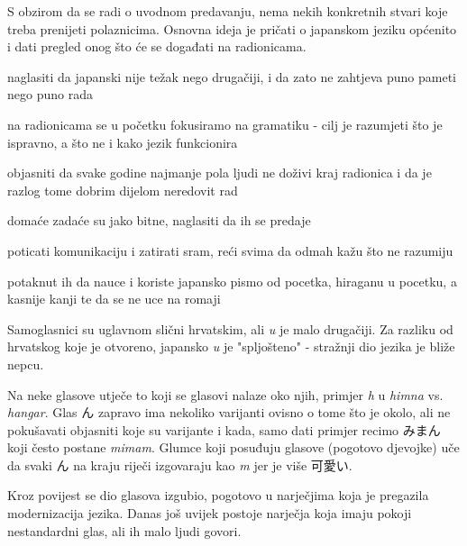 
\author{autor}

	
	S obzirom da se radi o uvodnom predavanju, nema nekih konkretnih stvari koje treba prenijeti polaznicima. Osnovna ideja je pričati o japanskom jeziku općenito i dati pregled onog što će se događati na radionicama.
	
	\begin{hyou}
		\item naglasiti da japanski nije težak nego drugačiji, i da zato ne zahtjeva puno pameti nego puno rada
		\item na radionicama se u početku fokusiramo na gramatiku - cilj je razumjeti što je ispravno, a što ne i kako jezik funkcionira
		\item objasniti da svake godine najmanje pola ljudi ne doživi kraj radionica i da je razlog tome dobrim dijelom neredovit rad
		\item domaće zadaće su jako bitne, naglasiti da ih se predaje
		\item poticati komunikaciju i zatirati sram, reći svima da odmah kažu što ne razumiju
		\item potaknut ih da nauce i koriste japansko pismo od pocetka, hiraganu u pocetku, a kasnije kanji te da se ne uce na romaji
	\end{hyou}

	
	Samoglasnici su uglavnom slični hrvatskim, ali \textit{u} je malo drugačiji. Za razliku od hrvatskog koje je otvoreno, japansko \textit{u} je "spljošteno" - stražnji dio jezika je bliže nepcu.
	
	\vspace{10pt}
	Na neke glasove utječe to koji se glasovi nalaze oko njih, primjer \textit{h} u \textit{himna} vs. \textit{hangar}. Glas ん zapravo ima nekoliko varijanti ovisno o tome što je okolo, ali ne pokušavati objasniti koje su varijante i kada, samo dati primjer recimo みまん koji često postane \textit{mimam}. Glumce koji posuđuju glasove (pogotovo djevojke) uče da svaki ん na kraju riječi izgovaraju kao \textit{m} jer je više 可愛い.
	
	\vspace{10pt}
	Kroz povijest se dio glasova izgubio, pogotovo u narječjima koja je pregazila modernizacija jezika. Danas još uvijek postoje narječja koja imaju pokoji nestandardni glas, ali ih malo ljudi govori.
	
